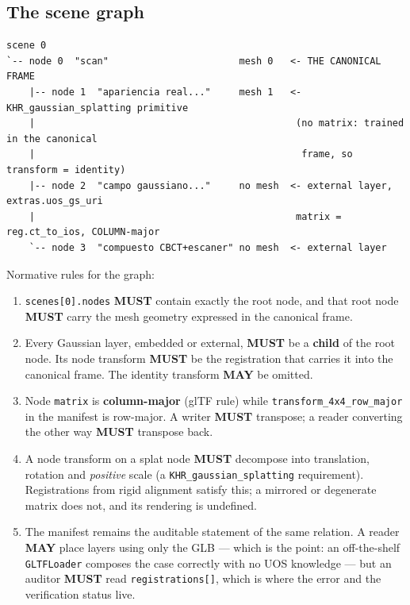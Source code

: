 \documentclass[11pt,a4paper]{article}
\newcommand{\MUST}{\textcolor{uosred}{\textbf{MUST}}}
\newcommand{\MAY}{\textcolor{uosgreen}{\textbf{MAY}}}
\newcommand{\code}[1]{\texttt{\small #1}}
\begin{document}
\subsection{The scene graph}\label{sec:graph}

\begin{lstlisting}[style=plain]
scene 0
`-- node 0  "scan"                       mesh 0   <- THE CANONICAL FRAME
    |-- node 1  "apariencia real..."     mesh 1   <- KHR_gaussian_splatting primitive
    |                                              (no matrix: trained in the canonical
    |                                               frame, so transform = identity)
    |-- node 2  "campo gaussiano..."     no mesh  <- external layer, extras.uos_gs_uri
    |                                              matrix = reg.ct_to_ios, COLUMN-major
    `-- node 3  "compuesto CBCT+escaner" no mesh  <- external layer
\end{lstlisting}

Normative rules for the graph:

\begin{enumerate}
  \item \code{scenes[0].nodes} \MUST{} contain exactly the root node, and that root node
  \MUST{} carry the mesh geometry expressed in the canonical frame.
  \item Every Gaussian layer, embedded or external, \MUST{} be a \textbf{child} of the root
  node. Its node transform \MUST{} be the registration that carries it into the canonical
  frame. The identity transform \MAY{} be omitted.
  \item Node \code{matrix} is \textbf{column-major} (glTF rule) while
  \code{transform\_4x4\_row\_major} in the manifest is row-major. A writer \MUST{}
  transpose; a reader converting the other way \MUST{} transpose back.
  \item A node transform on a splat node \MUST{} decompose into translation, rotation and
  \emph{positive} scale (a \code{KHR\_gaussian\_splatting} requirement). Registrations from
  rigid alignment satisfy this; a mirrored or degenerate matrix does not, and its rendering
  is undefined.
  \item The manifest remains the auditable statement of the same relation. A reader
  \MAY{} place layers using only the GLB --- which is the point: an off-the-shelf
  \code{GLTFLoader} composes the case correctly with no UOS knowledge --- but an auditor
  \MUST{} read \code{registrations[]}, which is where the error and the verification status
  live.
\end{enumerate}
\end{document}
